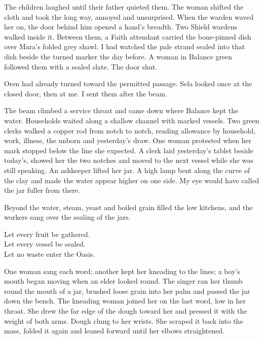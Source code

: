 The children laughed until their father quieted them. The woman shifted the cloth and took the long way, annoyed and unsurprised. When the warden waved her on, the door behind him opened a hand's breadth. Two Shield wardens walked inside it. Between them, a Faith attendant carried the bone-pinned dish over Mara's folded grey shawl. I had watched the pale strand sealed into that dish beside the turned marker the day before. A woman in Balance green followed them with a sealed slate. The door shut.\par

Oren had already turned toward the permitted passage. Sela looked once at the closed door, then at me. I sent them after the beam.\par

\ornament

The beam climbed a service throat and came down where Balance kept the water. Households waited along a shallow channel with marked vessels. Two green clerks walked a copper rod from notch to notch, reading allowance by household, work, illness, the unborn and yesterday's draw. One woman protested when her mark stopped below the line she expected. A clerk laid yesterday's tablet beside today's, showed her the two notches and moved to the next vessel while she was still speaking. An ashkeeper lifted her jar. A high lamp bent along the curve of the clay and made the water appear higher on one side. My eye would have called the jar fuller from there. \par

Beyond the water, steam, yeast and boiled grain filled the low kitchens, and the workers sang over the sealing of the jars.\par

\begin{scripture}
Let every fruit be gathered. \\
Let every vessel be sealed. \\
Let no waste enter the Oasis.
\end{scripture}

One woman sang each word; another kept her kneading to the lines; a boy's mouth began moving when an elder looked round. The singer ran her thumb round the mouth of a jar, brushed loose grain into her palm and passed the jar down the bench. The kneading woman joined her on the last word, low in her throat. She drew the far edge of the dough toward her and pressed it with the weight of both arms. Dough clung to her wrists. She scraped it back into the mass, folded it again and leaned forward until her elbows straightened.\par

